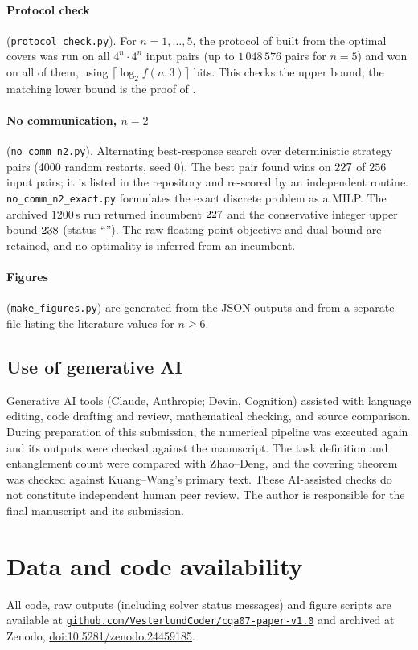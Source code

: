 \documentclass[12pt,a4paper]{article}
\theoremstyle{definition}
\theoremstyle{remark}
\newcommand{\zenodoDOI}{10.5281/zenodo.24459185}
\newcommand{\repoURL}{https://github.com/VesterlundCoder/cqa07-paper-v1.0}
\begin{document}
\paragraph{Protocol check} (\texttt{protocol\_check.py}). For $n=1,\dots,5$, the protocol of  built from the optimal covers was run on all $4^n\cdot4^n$ input pairs (up to $1\,048\,576$ pairs for $n=5$) and won on all of them, using $\lceil\log_2 f(n,3)\rceil$ bits. This checks the upper bound; the matching lower bound is the proof of .

\paragraph{No communication, $n=2$} (\texttt{no\_comm\_n2.py}). Alternating best-response search over deterministic strategy pairs (4000 random restarts, seed $0$). The best pair found wins on $227$ of $256$ input pairs; it is listed in the repository and re-scored by an independent routine. \texttt{no\_comm\_n2\_exact.py} formulates the exact discrete problem as a MILP. The archived $1200$\,s run returned incumbent $227$ and the conservative integer upper bound $238$ (status ``\NtwoStatus''). The raw floating-point objective and dual bound are retained, and no optimality is inferred from an incumbent.

\paragraph{Figures} (\texttt{make\_figures.py}) are generated from the JSON outputs and from a separate file listing the literature values for $n\ge6$.

\subsection*{Use of generative AI}
Generative AI tools (Claude, Anthropic; Devin, Cognition) assisted with language editing, code drafting and review, mathematical checking, and source comparison. During preparation of this submission, the numerical pipeline was executed again and its outputs were checked against the manuscript. The task definition and entanglement count were compared with Zhao--Deng, and the covering theorem was checked against Kuang--Wang's primary text. These AI-assisted checks do not constitute independent human peer review. The author is responsible for the final manuscript and its submission.

\section*{Data and code availability}
All code, raw outputs (including solver status messages) and figure scripts are available at \href{\repoURL}{\nolinkurl{github.com/VesterlundCoder/cqa07-paper-v1.0}} and archived at Zenodo, \href{https://doi.org/\zenodoDOI}{doi:\zenodoDOI}.
\end{document}
